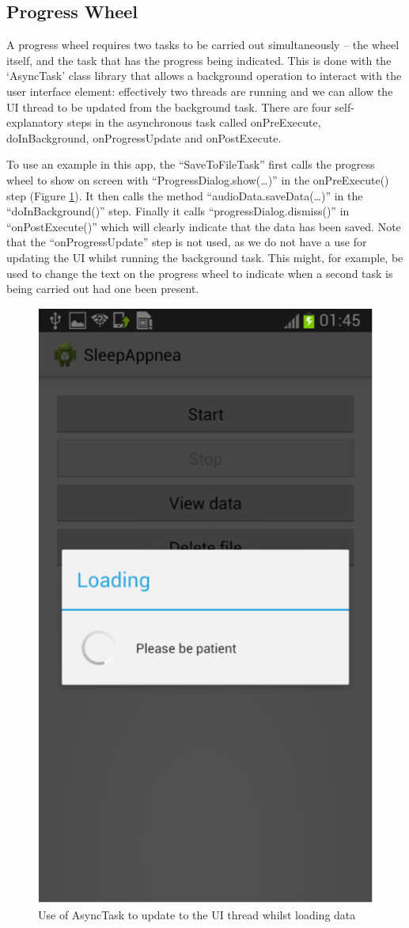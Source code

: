 \subsection{Progress Wheel}
A progress wheel requires two tasks to be carried out simultaneously -- the wheel itself, and the task that has the progress being indicated. This is done with the `AsyncTask' class library that allows a background operation to interact with the user interface element: effectively two threads are running and we can allow the UI thread to be updated from the background task. There are four self-explanatory steps in the asynchronous task called onPreExecute, doInBackground, onProgressUpdate and onPostExecute.

 To use an example in this app, the ``SaveToFileTask'' first calls the progress wheel to show on screen with ``ProgressDialog.show(…)'' in the onPreExecute() step (Figure \ref{fig:loadingData}). It then calls the method ``audioData.saveData(…)'' in the ``doInBackground()'' step. Finally it calls ``progressDialog.dismiss()'' in ``onPostExecute()'' which will clearly indicate that the data has been saved. Note that the ``onProgressUpdate'' step is not used, as we do not have a use for updating the UI whilst running the background task. This might, for example, be used to change the text on the progress wheel to indicate when a second task is being carried out had one been present.
\begin{figure}[ht!]
		\centering
			\includegraphics[width=.4\textwidth]{drawings/Loading.png}
		\caption{Use of AsyncTask to update to the UI thread whilst loading data}
		\label{fig:loadingData}
	\end{figure}

